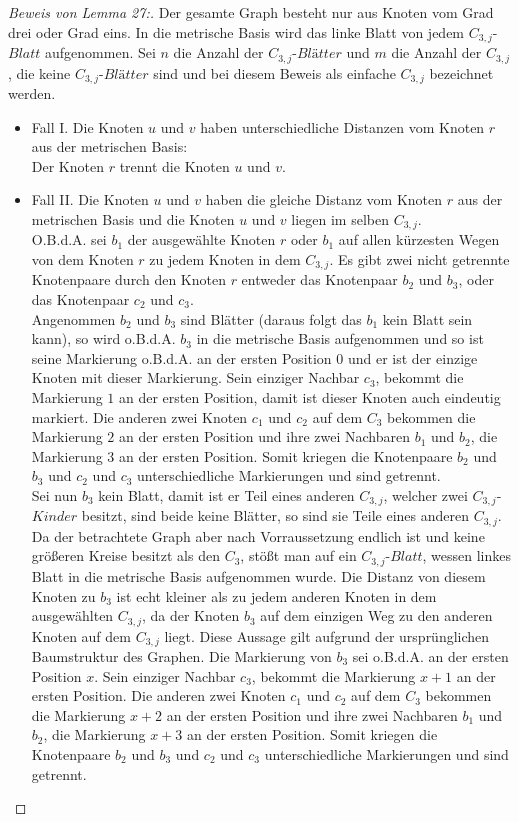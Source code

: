 \begin{proof}[Beweis von Lemma 27:]
Der gesamte Graph besteht nur aus Knoten vom Grad drei oder Grad eins. In die metrische Basis wird das linke Blatt von jedem $C_{3,j}$-$Blatt$ aufgenommen. Sei $n$ die Anzahl der $C_{3,j}$-$Blätter$ und $m$ die Anzahl der $C_{3,j}$, die keine $C_{3,j}$-$Blätter$ sind und bei diesem Beweis als einfache $C_{3,j}$ bezeichnet werden.\\
\begin{itemize}
\item Fall I. Die Knoten $u$ und $v$ haben unterschiedliche Distanzen vom Knoten $r$ aus der metrischen Basis:\\
Der Knoten $r$ trennt die Knoten $u$ und $v$.
\item Fall II. Die Knoten $u$ und $v$ haben die gleiche Distanz vom Knoten $r$ aus der metrischen Basis und die Knoten $u$ und $v$ liegen im selben $C_{3,j}$.\\
O.B.d.A. sei $b_1$ der ausgewählte Knoten $r$ oder $b_1$ auf allen kürzesten Wegen von dem Knoten $r$ zu jedem Knoten in dem $C_{3,j}$. Es gibt zwei nicht getrennte Knotenpaare durch den Knoten $r$ entweder das Knotenpaar $b_2$ und $b_3$, oder das Knotenpaar $c_2$ und $c_3$.\\
Angenommen $b_2$ und $b_3$ sind Blätter (daraus folgt das $b_1$ kein Blatt sein kann), so wird o.B.d.A. $b_3$ in die metrische Basis aufgenommen und so ist seine Markierung o.B.d.A. an der ersten Position $0$ und er ist der einzige Knoten mit dieser Markierung. Sein einziger Nachbar $c_3$, bekommt die Markierung $1$ an der ersten Position, damit ist dieser Knoten auch eindeutig markiert. Die anderen zwei Knoten $c_1$ und $c_2$ auf dem $C_3$ bekommen die Markierung $2$ an der ersten Position und ihre zwei Nachbaren $b_1$ und $b_2$, die Markierung $3$ an der ersten Position. Somit kriegen die Knotenpaare $b_2$ und $b_3$ und $c_2$ und $c_3$ unterschiedliche Markierungen und sind getrennt.\\
Sei nun $b_3$ kein Blatt, damit ist er Teil eines anderen $C_{3,j}$, welcher zwei $C_{3,j}$-$Kinder$ besitzt, sind beide keine Blätter, so sind sie Teile eines anderen $C_{3,j}$. Da der betrachtete Graph aber nach Vorraussetzung endlich ist und keine größeren Kreise besitzt als den $C_3$, stößt man auf ein $C_{3,j}$-$Blatt$, wessen linkes Blatt in die metrische Basis aufgenommen wurde. Die Distanz von diesem Knoten zu $b_3$ ist echt kleiner als zu jedem anderen Knoten in dem ausgewählten $C_{3,j}$, da der Knoten $b_3$ auf dem einzigen Weg zu den anderen Knoten auf dem $C_{3,j}$ liegt. Diese Aussage gilt aufgrund der ursprünglichen Baumstruktur des Graphen. Die Markierung von $b_3$ sei o.B.d.A. an der ersten Position $x$. Sein einziger Nachbar $c_3$, bekommt die Markierung $x+1$ an der ersten Position. Die anderen zwei Knoten $c_1$ und $c_2$ auf dem $C_3$ bekommen die Markierung $x+2$ an der ersten Position und ihre zwei Nachbaren $b_1$ und $b_2$, die Markierung $x+3$ an der ersten Position. Somit kriegen die Knotenpaare $b_2$ und $b_3$ und $c_2$ und $c_3$ unterschiedliche Markierungen und sind getrennt.


\end{itemize}
\end{proof}
